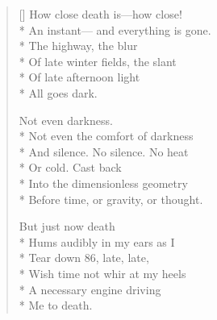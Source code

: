 \label{ch:driving_down}
\settowidth{\versewidth}{An instant--- and everything is gone.}
\begin{verse}[\versewidth]
How close death is---how close!\\*
An instant--- and everything is gone.\\*
The highway, the blur\\*
Of late winter fields, the slant\\*
Of late afternoon light\\*
All goes dark.

Not even darkness.\\*
Not even the comfort of darkness\\*
And silence. No silence. No heat\\*
Or cold.  Cast back\\*
Into the dimensionless geometry\\*
Before time, or gravity, or thought.

But just now death\\*
Hums audibly in my ears as I\\*
Tear down 86, late, late,\\*
Wish time not whir at my heels\\*
A necessary engine driving \\*
Me to death.
\end{verse}

